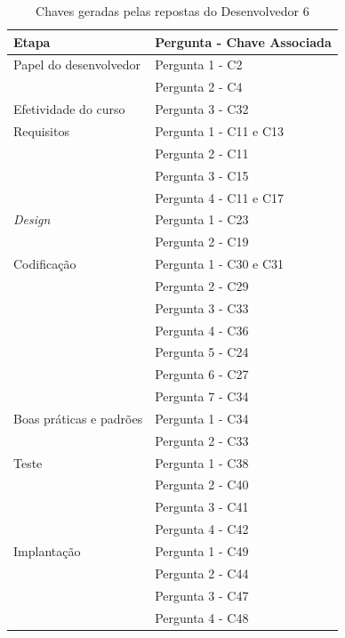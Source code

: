 \begin{table}[h]
	\centering
	\begin{tabular}{|m{4.8cm} | m{4.8cm} |}
		\hline
		\textbf{Etapa} & \textbf{Pergunta - Chave Associada} \\ \hline
		Papel do desenvolvedor & Pergunta 1 - C2 \\ \cline{2-2}
		& Pergunta 2 - C4 \\ \cline{2-2}
		\hline
		Efetividade do curso & Pergunta 3 - C32  \\ \cline{2-2}
		\hline
		Requisitos & Pergunta 1 - C11 e C13 \\ \cline{2-2}
		 & Pergunta 2 - C11 \\ \cline{2-2}
		& Pergunta 3 - C15 \\ \cline{2-2}
		& Pergunta 4 - C11 e C17 \\ \cline{2-2}
		\hline
		\textit{Design} & Pergunta 1 - C23 \\ \cline{2-2}
		& Pergunta 2 - C19 \\ \cline{2-2}
		\hline
		Codificação & Pergunta 1 - C30 e C31 \\ \cline{2-2}
		& Pergunta 2 - C29 \\ \cline{2-2}
		& Pergunta 3 - C33 \\ \cline{2-2}
		& Pergunta 4 - C36 \\ \cline{2-2}
		& Pergunta 5 - C24 \\ \cline{2-2}
		& Pergunta 6 - C27 \\ \cline{2-2}
		& Pergunta 7 - C34 \\ \cline{2-2} \hline
		Boas práticas e padrões & Pergunta 1 - C34 \\ \cline{2-2}
		& Pergunta 2 - C33 \\ \cline{2-2}
		\hline
		Teste & Pergunta 1 - C38 \\ \cline{2-2}
		& Pergunta 2 - C40 \\ \cline{2-2}
		& Pergunta 3 - C41 \\ \cline{2-2}
		& Pergunta 4 - C42 \\ \cline{2-2}
		\hline
		Implantação & Pergunta 1 - C49 \\ \cline{2-2}
		& Pergunta 2 - C44 \\ \cline{2-2}
		& Pergunta 3 - C47 \\ \cline{2-2}
		& Pergunta 4 - C48 \\ \cline{2-2}
		\hline
	\end{tabular}

	\caption{Chaves geradas pelas repostas do Desenvolvedor 6}
	\label{tab08}
\end{table}


